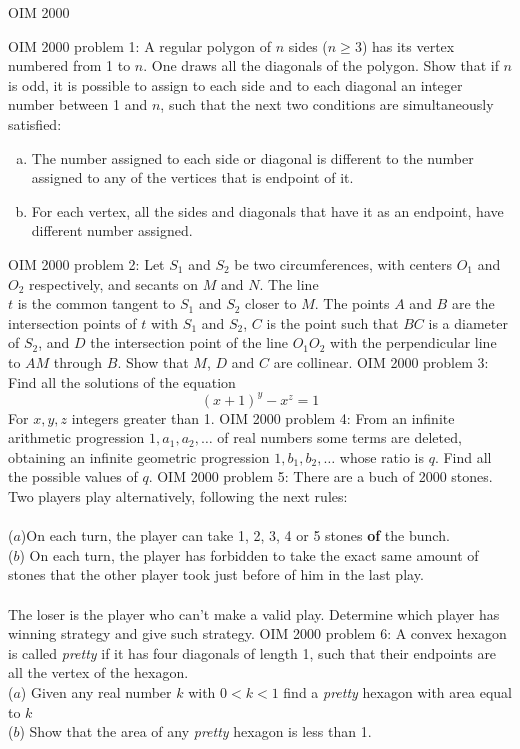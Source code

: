 OIM 2000 

OIM 2000 problem 1:  A regular polygon of $ n$ sides ($ n\geq3$) has its vertex numbered from 1 to $ n$. One draws all the diagonals of the polygon. Show that if $ n$ is odd, it is possible to assign to each side and to each diagonal an integer number between 1 and $ n$, such that the next two conditions are simultaneously satisfied:
\begin{enumerate}[(a)]
  \item The number assigned to each side or diagonal is different to the number assigned to any of the vertices that is endpoint of it.
  \item For each vertex, all the sides and diagonals that have it as an endpoint, have different number assigned.
\end{enumerate} 
OIM 2000 problem 2:  Let $S_1$ and $S_2$ be two circumferences, with centers $O_1$ and $O_2$ respectively, and secants on $M$ and $N$. The line \\
$t$ is the common tangent to  $S_1$ and $S_2$ closer to $M$. The points $A$ and $B$ are the intersection points of $t$ with $S_1$ and $S_2$, $C$ is the point such that $BC$ is a diameter of $S_2$, and $D$ the intersection point of the line $O_1O_2$ with the perpendicular line to $AM$ through $B$. Show that $M$, $D$ and $C$ are collinear. 
OIM 2000 problem 3:  Find all the solutions of the equation
\[ \left(x+1\right)^y-x^z=1 \]
For $x,y,z$ integers greater than 1. 
OIM 2000 problem 4:  From an infinite arithmetic progression $ 1,a_1,a_2,\dots$ of real numbers some terms are deleted, obtaining an infinite geometric progression $ 1,b_1,b_2,\dots$ whose ratio is $ q$. Find all the possible values of $ q$. 
OIM 2000 problem 5:  There are a buch of 2000 stones. Two players play alternatively, following the next rules: \\\\
($a$)On each turn, the player can take 1, 2, 3, 4 or 5 stones \textbf{of} the bunch. \\
($b$) On each turn, the player has forbidden to take the exact same amount of stones that the other player took just before of him in the last play. \\\\
The loser is the player who can't make a valid play. Determine which player has winning strategy and give such strategy. 
OIM 2000 problem 6:  A convex hexagon is called \textit{pretty} if it has four diagonals of length 1, such that their endpoints are all the vertex of the hexagon. \\
($a$) Given any real number $k$ with $0<k<1$ find a \textit{pretty} hexagon with area equal to $k$ \\
($b$) Show that the area of any \textit{pretty} hexagon is less than 1. 

